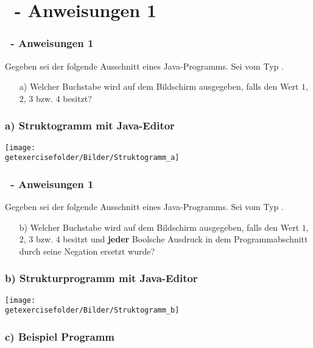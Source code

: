 \def\stitle{\theexercise\ - Anweisungen 1}
\section{\stitle}
\begin{frame}[t]%
    \frametitle{\stitle}

Gegeben sei der folgende Ausschnitt eines Java-Programms. Sei  vom Typ .



\begin{itemize}
\item[a)] Welcher Buchstabe wird auf dem Bildschirm ausgegeben, falls  den Wert $1$, $2$, $3$ bzw. $4$ besitzt?
\end{itemize}
\end{frame}


\begin{frame}[fragile]%
 \frametitle{a) Struktogramm mit Java-Editor}%

\begin{center}

\texttt{[image: \\getexercisefolder/Bilder/Struktogramm\_a]}
\end{center}

\end{frame}

\begin{frame}[t]%
    \frametitle{\stitle}

Gegeben sei der folgende Ausschnitt eines Java-Programms. Sei  vom Typ .



\begin{itemize}
\item[b)] Welcher Buchstabe wird auf dem Bildschirm ausgegeben, falls  den Wert $1$, $2$, $3$ bzw. $4$ besitzt und \textbf{jeder} Boolsche Ausdruck in dem Programmabschnitt durch seine Negation ersetzt wurde?
\end{itemize}
\end{frame}

\begin{frame}[fragile]%
\frametitle{b) Strukturprogramm mit Java-Editor}%
\begin{center}

\texttt{[image: \\getexercisefolder/Bilder/Struktogramm\_b]}
\end{center}

\end{frame}


\begin{frame}[fragile]%
 \frametitle{c) Beispiel Programm}%

\end{frame}
